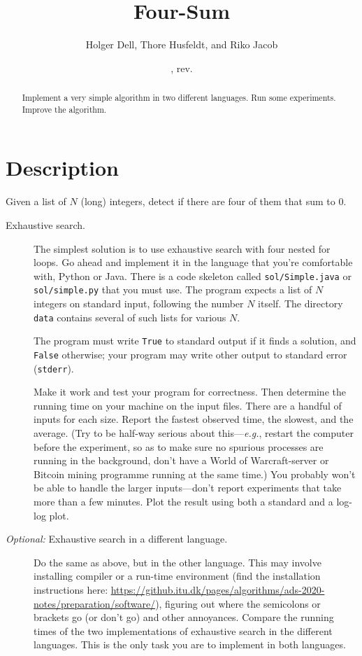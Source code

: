 \documentclass{tufte-handout}
\title{Four-Sum}
\author{Holger Dell, Thore Husfeldt, and Riko Jacob}
\date{\GITAuthorDate, rev. \GITAbrHash}
\begin{document}
\maketitle
\begin{abstract}
  Implement a very simple algorithm in two different languages. Run some experiments.
  Improve the algorithm.
\end{abstract}


 \section{Description}

 Given a list of $N$ (long) integers, detect if there are four of them that sum to $0$.

\begin{description}
  \item[Exhaustive search.]
The simplest solution is to use exhaustive search with four nested for loops.
Go ahead and implement it in the language that you're comfortable with, Python or Java.
There is a code skeleton called \texttt{sol/Simple.java} or \texttt{sol/simple.py} that you must use.
The program expects a list of $N$ integers on standard input, following the number $N$ itself.
The directory \texttt{data} contains several of such lists for various $N$.

The program must write \texttt{True} to standard output if it finds a solution, and \texttt{False} otherwise;
your program may write other output to standard error (\texttt{stderr}).

Make it work and test your program for correctness.
Then determine the running time on your machine on the input files. 
There are a handful of inputs for each size.
Report the fastest observed time, the slowest, and the average.
(Try to be half-way serious about this---\emph{e.g.}, restart the computer before the experiment, so as to make sure no spurious processes are running in the background, don't have a World of Warcraft-server or Bitcoin mining programme running at the same time.)
You probably won't be able to handle the larger inputs---don't report experiments that take more than a few minutes.
Plot the result using both a standard and a log-log plot.

\item[\emph{Optional:} Exhaustive search in a different language.]
  Do the same as above, but in the other language.
  This may involve installing compiler or a run-time environment (find the installation instructions here: \url{https://github.itu.dk/pages/algorithms/ads-2020-notes/preparation/software/}), figuring out where the semicolons or brackets go (or don't go) and other annoyances.
  Compare the running times of the two implementations of exhaustive search in the different languages.
  This is the only task you are to implement in both languages.


\end{description}
\end{document}
